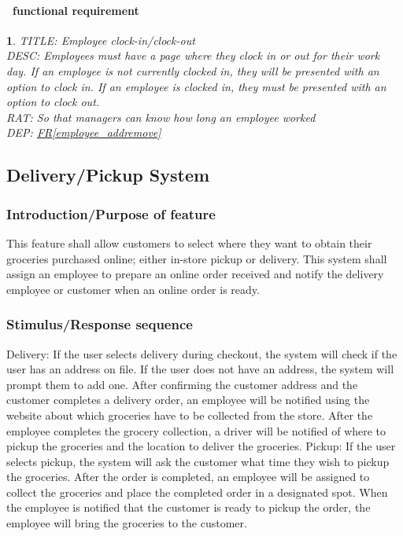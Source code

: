 \documentclass{scrreprt}
\theoremstyle{funreq}
\newtheorem{funreq}{}
\newcommand*{\reqref}[1]{\hyperref[#1]{FR\ref*{#1}}}
\begin{document}
	\paragraph[]{\Subsectionname ~functional requirement }
	\begin{funreq}
		\label{employee_clock}
		TITLE: Employee clock-in/clock-out\\
		DESC: Employees must have a page where they clock in or out for their work day.  If an employee is not currently clocked in, they will be presented with an option to clock in.  If an employee is clocked in, they must be presented with an option to clock out.\\
		RAT: So that managers can know how long an employee worked\\
		DEP: \reqref{employee_addremove}
	\end{funreq}
	
	\subsection{Delivery/Pickup System}
	\subsubsection{Introduction/Purpose of feature}
    This feature shall allow customers to select where they want to obtain their groceries purchased online; either in-store pickup or delivery. This system shall assign an employee to prepare an online order received and notify the delivery employee or customer when an online order is ready.

	\subsubsection{Stimulus/Response sequence}
	Delivery: If the user selects delivery during checkout, the system will check if the user has an address on file.  If the user does not have an address, the system will prompt them to add one.  After confirming the customer address and the customer completes a delivery order, an employee will be notified using the website about which groceries have to be collected from the store.  After the employee completes the grocery collection, a driver will be notified of where to pickup the groceries and the location to deliver the groceries.
	Pickup: If the user selects pickup, the system will ask the customer what time they wish to pickup the groceries.  After the order is completed, an employee will be assigned to collect the groceries and place the completed order in a designated spot.  When the employee is notified that the customer is ready to pickup the order, the employee will bring the groceries to the customer.
	\raggedbottom
	
\end{document}
